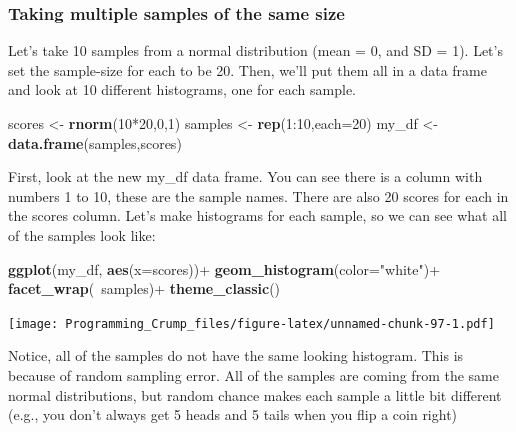 \documentclass[]{book}
\newenvironment{Shaded}{\begin{snugshade}}{\end{snugshade}}
\newcommand{\KeywordTok}[1]{\textcolor[rgb]{0.13,0.29,0.53}{\textbf{{#1}}}}
\newcommand{\DataTypeTok}[1]{\textcolor[rgb]{0.13,0.29,0.53}{{#1}}}
\newcommand{\DecValTok}[1]{\textcolor[rgb]{0.00,0.00,0.81}{{#1}}}
\newcommand{\StringTok}[1]{\textcolor[rgb]{0.31,0.60,0.02}{{#1}}}
\newcommand{\NormalTok}[1]{{#1}}
\theoremstyle{definition}
\theoremstyle{definition}
\theoremstyle{definition}
\theoremstyle{remark}
\begin{document}
\subsubsection{Taking multiple samples of the same
size}\label{taking-multiple-samples-of-the-same-size}

Let's take 10 samples from a normal distribution (mean = 0, and SD = 1).
Let's set the sample-size for each to be 20. Then, we'll put them all in
a data frame and look at 10 different histograms, one for each sample.

\begin{Shaded}
\begin{Highlighting}[]
\NormalTok{scores <-}\StringTok{ }\KeywordTok{rnorm}\NormalTok{(}\DecValTok{10}\NormalTok{*}\DecValTok{20}\NormalTok{,}\DecValTok{0}\NormalTok{,}\DecValTok{1}\NormalTok{)}
\NormalTok{samples <-}\StringTok{ }\KeywordTok{rep}\NormalTok{(}\DecValTok{1}\NormalTok{:}\DecValTok{10}\NormalTok{,}\DataTypeTok{each=}\DecValTok{20}\NormalTok{)}
\NormalTok{my_df <-}\StringTok{ }\KeywordTok{data.frame}\NormalTok{(samples,scores)}
\end{Highlighting}
\end{Shaded}

First, look at the new my\_df data frame. You can see there is a column
with numbers 1 to 10, these are the sample names. There are also 20
scores for each in the scores column. Let's make histograms for each
sample, so we can see what all of the samples look like:

\begin{Shaded}
\begin{Highlighting}[]
\KeywordTok{ggplot}\NormalTok{(my_df, }\KeywordTok{aes}\NormalTok{(}\DataTypeTok{x=}\NormalTok{scores))+}
\StringTok{  }\KeywordTok{geom_histogram}\NormalTok{(}\DataTypeTok{color=}\StringTok{"white"}\NormalTok{)+}
\StringTok{  }\KeywordTok{facet_wrap}\NormalTok{(~samples)+}
\StringTok{  }\KeywordTok{theme_classic}\NormalTok{()}
\end{Highlighting}
\end{Shaded}

\texttt{[image: Programming\_Crump\_files/figure-latex/unnamed-chunk-97-1.pdf]}

Notice, all of the samples do not have the same looking histogram. This
is because of random sampling error. All of the samples are coming from
the same normal distributions, but random chance makes each sample a
little bit different (e.g., you don't always get 5 heads and 5 tails
when you flip a coin right)
\end{document}

